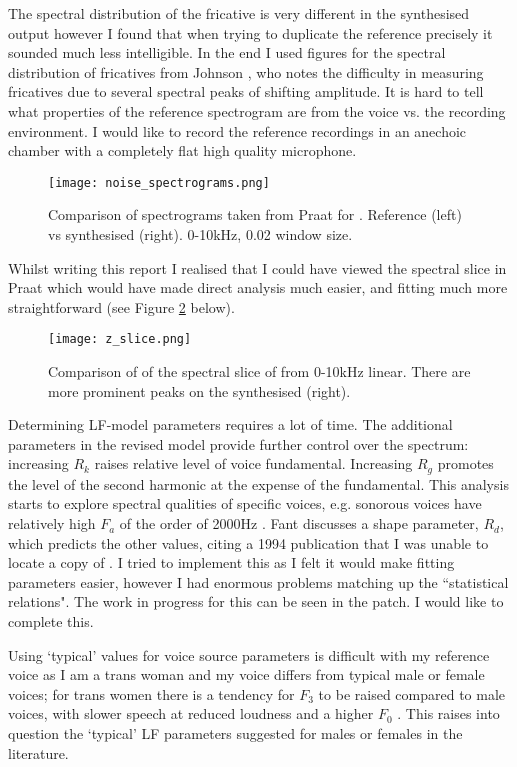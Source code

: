 The spectral distribution of the fricative  is very different in the synthesised output however I found that when trying to duplicate the reference precisely it sounded much less intelligible. In the end I used figures for the spectral distribution of fricatives from Johnson \cite{Johnson2003}, who notes the difficulty in measuring fricatives due to several spectral peaks of shifting amplitude. It is hard to tell what properties of the reference spectrogram are from the voice vs. the recording environment. I would like to record the reference recordings in an anechoic chamber with a completely flat high quality microphone. 
%
\begin{figure}[H] 
	\texttt{[image: noise\_spectrograms.png]}
	\caption{Comparison of spectrograms taken from Praat for . Reference (left) vs synthesised (right). 0-10kHz, 0.02 window size.}
	\label{fig:noise_spectrograms}
\end{figure}
%
Whilst writing this report I realised that I could have viewed the spectral slice in Praat which would have made direct analysis much easier, and fitting much more straightforward (see Figure \ref{fig:z_slice} below).
%
\begin{figure}[H] 
	\texttt{[image: z\_slice.png]}
	\caption{Comparison of of the spectral slice of  from 0-10kHz linear. There are more prominent peaks on the synthesised (right).}
	\label{fig:z_slice}
\end{figure}
%
Determining  LF-model parameters requires a lot of time. The additional parameters in the revised model \cite{Fant1995} provide further control over the spectrum: increasing $R_k$ raises relative level of voice fundamental. Increasing $R_g$ promotes the level of the second harmonic at the expense of the fundamental. This analysis starts to explore spectral qualities of specific voices, e.g. sonorous voices have relatively high $F_a$ of the order of \si{2000Hz} \cite{Fant1995}. Fant discusses a shape parameter, $R_d$, which predicts the other values, citing a 1994 publication that I was unable to locate a copy of \cite{Fant1994}. I tried to implement this as I felt it would make fitting parameters easier, however I had enormous problems matching up the ``statistical relations". The work in progress for this can be seen in the  patch. I would like to complete this.

Using `typical' values for voice source parameters is difficult with my reference voice as I am a trans woman and my voice differs from typical male or female voices; for trans women there is a tendency for $F_3$ to be raised compared to male voices, with slower speech at reduced loudness and a higher $F_0$ \cite{Gunzburger1995}. This raises into question the `typical' LF parameters suggested for males or females in the literature.

